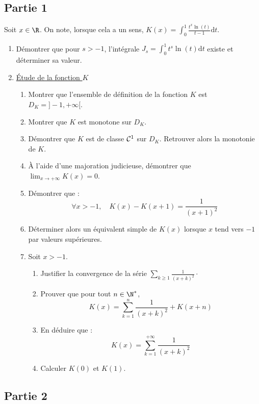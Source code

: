\documentclass[twoside,french,11pt]{VcCours}
\newcommand{\dt}{\text{d}t}
\begin{document}
\subsection*{Partie 1}
Soit $x\in \R$. On note, lorsque cela a un sens, $K(x)=\int_0^1\frac{t^x\ln(t)}{t-1}\dt$.
\begin{enumerate}
\item Démontrer que pour $s>-1$, l'intégrale $J_s=\int_0^1t^s\ln(t)\dt$ existe et déterminer sa valeur.
\item \underline{Étude de la fonction $K$}
\begin{enumerate}
	\item Montrer que l'ensemble de définition de la fonction $K$ est $D_K=]-1,+\infty[$.
	\item Montrer que $K$ est monotone sur $D_K$.
\item Démontrer que $K$ est de classe ${\cal C}^1$ sur $D_K$. Retrouver alors la monotonie de $K$.
\item À l'aide d'une majoration judicieuse, démontrer que $\lim_{x\to +\infty}K(x)=0$.
\item Démontrer que :
\[\forall x>-1,\quad K(x)-K(x+1)=\frac{1}{(x+1)^2}\]
\item Déterminer alors un équivalent simple de $K(x)$ lorsque $x$ tend vers $-1$ par valeurs supérieures.
\item Soit $x>-1$.
\begin{enumerate}
	\item Justifier la convergence de la série $\sum_{k\geq 1}\frac{1}{(x+k)^2} \cdot$
	\item Prouver que pour tout $n\in \N^*$, 
	\[K(x)=\sum_{k=1}^n\frac{1}{(x+k)^2}+K(x+n)\]
	\item En déduire que :
	\[K(x)=\sum_{k=1}^{+ \infty} \frac{1}{(x+k)^2}\]
	\item Calculer $K(0)$ et $K(1)$.
\end{enumerate}
\end{enumerate}
\end{enumerate}

\subsection*{Partie 2}
\end{document}

